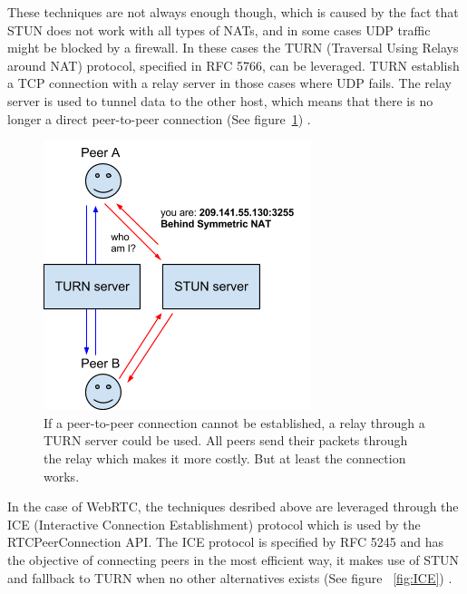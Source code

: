 These techniques are not always enough though, which is caused by the fact that STUN does not work with all types of NATs, and in some cases UDP traffic might be blocked by a firewall. In these cases the TURN (Traversal Using Relays around NAT) protocol, specified in RFC 5766, can be leveraged.  TURN establish a TCP connection with a relay server in those cases where UDP fails. The relay server is used to tunnel data to the other host, which means that there is no longer a direct peer-to-peer connection (See figure~\ref{fig:WebRTC - TURN}) \cite{RFC5766:Online}.

\begin{figure}[htp]
\centering
\includegraphics[width=\textwidth,height=0.2\paperheight,keepaspectratio
]{figures/webrtc-turn}
\caption{If a peer-to-peer connection cannot be established, a relay through a TURN server could be used. All peers send their packets through the relay which makes it more costly. But at least the connection works\cite{WebRTCArchitecture:2014:Online}.}
\label{fig:WebRTC - TURN}
\end{figure}

In the case of WebRTC, the techniques desribed above are leveraged through the ICE (Interactive Connection Establishment) protocol which is used by the RTCPeerConnection API. The ICE protocol is specified by RFC 5245 and has the objective of connecting peers in the most efficient way, it makes use of STUN and fallback to TURN when no other alternatives exists (See figure ~\ref{fig:ICE}) \cite{RFC5245:Online}.

